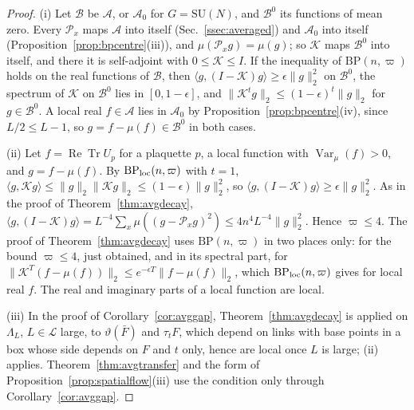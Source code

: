 \documentclass[aps,prd,twocolumn,superscriptaddress,nofootinbib,longbibliography,floatfix,amsmath,amssymb,10pt]{revtex4-2}
\theoremstyle{definition}
\theoremstyle{remark}
\newcommand{\SU}{\mathrm{SU}}
\newcommand{\ReTr}{\operatorname{Re}\operatorname{Tr}}
\newcommand{\Var}{\operatorname{Var}}
\newcommand{\ip}[2]{\langle #1,#2\rangle}
\begin{document}
\begin{proof}
(i) Let $\mathcal B$ be $\mathcal A$, or $\mathcal A_0$ for $G=\SU(N)$, and
$\mathcal B^0$ its functions of mean zero. Every $\mathcal P_x$ maps
$\mathcal A$ into itself (Sec.~\ref{ssec:averaged}) and $\mathcal A_0$ into
itself (Proposition~\ref{prop:bpcentre}(iii)), and $\mu(\mathcal P_xg)=
\mu(g)$; so $\mathcal K$ maps $\mathcal B^0$ into itself, and there it is self-adjoint with
$0\le\mathcal K\le I$. If the inequality of $\mathrm{BP}(n,\varpi)$ holds on
the real functions of $\mathcal B$, then $\ip g{(I-\mathcal K)g}\ge
\epsilon\lVert g\rVert_2^2$ on $\mathcal B^0$, the spectrum of $\mathcal K$
on $\mathcal B^0$ lies in $[0,1-\epsilon]$, and $\lVert\mathcal K^tg
\rVert_2\le(1-\epsilon)^t\lVert g\rVert_2$ for $g\in\mathcal B^0$. A local
real $f\in\mathcal A$ lies in $\mathcal A_0$ by
Proposition~\ref{prop:bpcentre}(iv), since $L/2\le L-1$, so $g=f-\mu(f)\in
\mathcal B^0$ in both cases.

(ii) Let $f=\ReTr U_p$ for a plaquette $p$, a local function with $\Var_\mu
(f)>0$, and $g=f-\mu(f)$. By $\mathrm{BP}_{\rm loc}(n,\varpi)$ with $t=1$,
$\ip g{\mathcal Kg}\le\lVert g\rVert_2\lVert\mathcal Kg\rVert_2\le(1-
\epsilon)\lVert g\rVert_2^2$, so $\ip g{(I-\mathcal K)g}\ge\epsilon\lVert g
\rVert_2^2$. As in the proof of Theorem~\ref{thm:avgdecay}, $\ip g{(I-
\mathcal K)g}=L^{-4}\sum_x\mu((g-\mathcal P_xg)^2)\le4n^4L^{-4}\lVert g
\rVert_2^2$. Hence $\varpi\le4$. The proof of Theorem~\ref{thm:avgdecay}
uses $\mathrm{BP}(n,\varpi)$ in two places only: for the bound $\varpi\le4$,
just obtained, and in its spectral part, for $\lVert\mathcal K^T(f-\mu(f))
\rVert_2\le e^{-\epsilon T}\lVert f-\mu(f)\rVert_2$, which
$\mathrm{BP}_{\rm loc}(n,\varpi)$ gives for local real $f$. The real and
imaginary parts of a local function are local.

(iii) In the proof of Corollary~\ref{cor:avggap},
Theorem~\ref{thm:avgdecay} is applied on $\Lambda_L$, $L\in\mathcal L$
large, to $\vartheta(\bar F)$ and $\tau_tF$, which depend on links with base
points in a box whose side depends on $F$ and $t$ only, hence are local once
$L$ is large; (ii) applies. Theorem~\ref{thm:avgtransfer} and the form of
Proposition~\ref{prop:spatialflow}(iii) use the condition only through
Corollary~\ref{cor:avggap}.


\end{proof}
\end{document}
